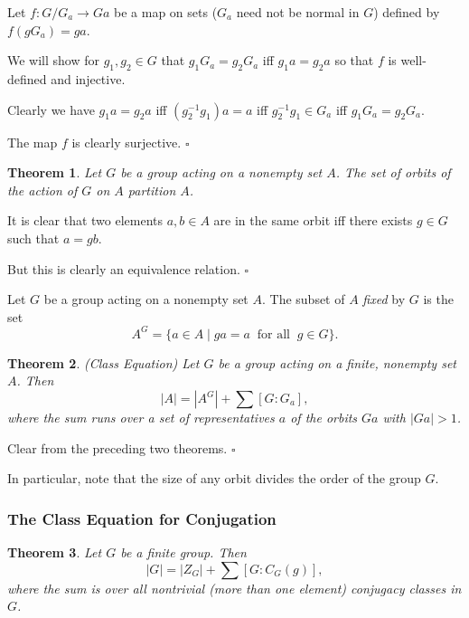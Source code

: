 \documentclass[10pt]{article}
\newtheorem{theorem}{Theorem}[section]
\newenvironment{proof}[1][Proof]{\begin{trivlist}
\item[\hskip \labelsep {\itshape #1}]}{\end{trivlist}}
\newenvironment{definition}[1][Definition]{\begin{trivlist}
\item[\hskip \labelsep {\bfseries #1}]}{\end{trivlist}}
\begin{document}
\begin{proof}
Let $f : G/G_a \to Ga$ be a map on sets ($G_a$ need not be normal in $G$) defined by $f(gG_a) = ga$.

We will show for $g_1, g_2 \in G$ that $g_1G_a = g_2G_a$ iff $g_1a = g_2a$ so that $f$ is well-defined and injective.

Clearly we have $g_1a = g_2a$ iff $(g_2^{-1}g_1)a = a$ iff $g_2^{-1}g_1 \in G_a$ iff $g_1G_a = g_2G_a$.

The map $f$ is clearly surjective. $\square$
\end{proof}

\begin{theorem}
Let $G$ be a group acting on a nonempty set $A$. The set of orbits of the action of $G$ on $A$ partition $A$.
\end{theorem}

\begin{proof}
It is clear that two elements $a, b \in A$ are in the same orbit iff there exists $g \in G$ such that $a = gb$.

But this is clearly an equivalence relation. $\square$
\end{proof}

\begin{definition}
Let $G$ be a group acting on a nonempty set $A$. The subset of $A$ \emph{fixed} by $G$ is the set
$$A^G = \{a \in A \;|\; ga = a \;\;\mbox{for all}\;\; g \in G\}.$$
\end{definition}

\begin{theorem} (Class Equation)
Let $G$ be a group acting on a finite, nonempty set $A$. Then
$$|A| = |A^G| + \sum [G:G_a],$$
where the sum runs over a set of representatives $a$ of the orbits $Ga$ with $|Ga| > 1$.
\end{theorem}

\begin{proof}
Clear from the preceding two theorems. $\square$
\end{proof}

In particular, note that the size of any orbit divides the order of the group $G$.

\subsubsection{The Class Equation for Conjugation}

\begin{theorem}
Let $G$ be a finite group. Then
$$|G| = |Z_G| + \sum [G:C_G(g)],$$
where the sum is over all nontrivial (more than one element) conjugacy classes in $G$.
\end{theorem}
\end{document}
